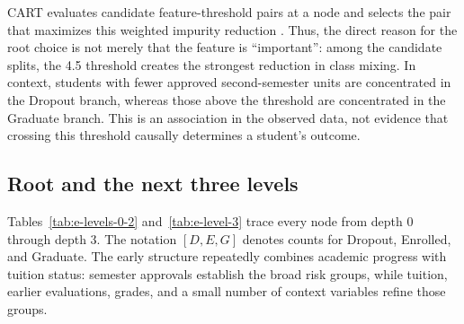 CART evaluates candidate feature-threshold pairs at a node and selects the
pair that maximizes this weighted impurity reduction
\citep{breiman1984classification}. Thus, the direct reason for the root choice
is not merely that the feature is ``important'': among the candidate splits,
the 4.5 threshold creates the strongest reduction in class mixing. In context,
students with fewer approved second-semester units are concentrated in the
Dropout branch, whereas those above the threshold are concentrated in the
Graduate branch. This is an association in the observed data, not evidence
that crossing this threshold causally determines a student's outcome.

\subsection{Root and the next three levels}

Tables~\ref{tab:e-levels-0-2} and~\ref{tab:e-level-3} trace every node from
depth 0 through depth 3. The notation $[D,E,G]$ denotes counts for Dropout,
Enrolled, and Graduate. The early structure repeatedly combines academic
progress with tuition status: semester approvals establish the broad risk
groups, while tuition, earlier evaluations, grades, and a small number of
context variables refine those groups.

